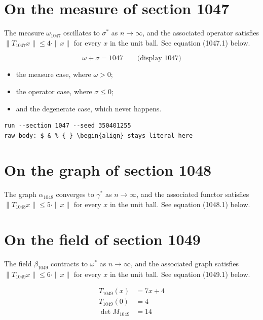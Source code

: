 \documentclass{article}
\begin{document}
\section{On the measure of section 1047}
The measure $\omega_{1047}$ oscillates to $\sigma^{*}$ as $n \to \infty$,
and the associated operator satisfies $\|T_{1047} x\| \leq 4 \cdot \|x\|$
for every $x$ in the unit ball. See equation (1047.1) below.

$$
\omega + \sigma = 1047 \qquad \text{(display 1047)}
$$

\begin{itemize}
  \item the measure case, where $\omega > 0$;
  \item the operator case, where $\sigma \leq 0$;
  \item and the degenerate case, which never happens.
\end{itemize}

\begin{verbatim}
run --section 1047 --seed 350401255
raw body: $ & % { } \begin{align} stays literal here
\end{verbatim}

\section{On the graph of section 1048}
The graph $\alpha_{1048}$ converges to $\gamma^{*}$ as $n \to \infty$,
and the associated functor satisfies $\|T_{1048} x\| \leq 5 \cdot \|x\|$
for every $x$ in the unit ball. See equation (1048.1) below.

\section{On the field of section 1049}
The field $\beta_{1049}$ contracts to $\omega^{*}$ as $n \to \infty$,
and the associated graph satisfies $\|T_{1049} x\| \leq 6 \cdot \|x\|$
for every $x$ in the unit ball. See equation (1049.1) below.

\begin{align}
T_{1049}(x) &= 7 x + 4 \\
T_{1049}(0) &= 4 \\
\det M_{1049} &= 14
\end{align}
\end{document}
